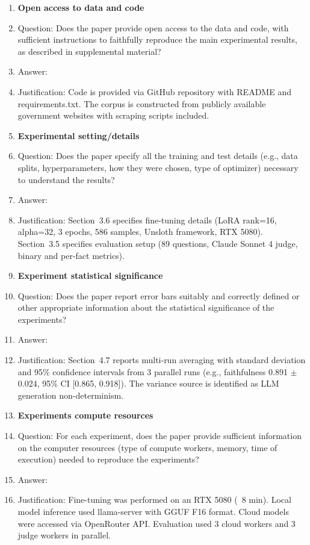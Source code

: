 \begin{enumerate}
\item {\bf Open access to data and code}
    \item[] Question: Does the paper provide open access to the data and code, with sufficient instructions to faithfully reproduce the main experimental results, as described in supplemental material?
    \item[] Answer: \answerYes{}
    \item[] Justification: Code is provided via GitHub repository with README and requirements.txt. The corpus is constructed from publicly available government websites with scraping scripts included.

\item {\bf Experimental setting/details}
    \item[] Question: Does the paper specify all the training and test details (e.g., data splits, hyperparameters, how they were chosen, type of optimizer) necessary to understand the results?
    \item[] Answer: \answerYes{}
    \item[] Justification: Section~3.6 specifies fine-tuning details (LoRA rank=16, alpha=32, 3 epochs, 586 samples, Unsloth framework, RTX 5080). Section~3.5 specifies evaluation setup (89 questions, Claude Sonnet 4 judge, binary and per-fact metrics).

\item {\bf Experiment statistical significance}
    \item[] Question: Does the paper report error bars suitably and correctly defined or other appropriate information about the statistical significance of the experiments?
    \item[] Answer: \answerYes{}
    \item[] Justification: Section~4.7 reports multi-run averaging with standard deviation and 95\% confidence intervals from 3 parallel runs (e.g., faithfulness 0.891 $\pm$ 0.024, 95\% CI [0.865, 0.918]). The variance source is identified as LLM generation non-determinism.

\item {\bf Experiments compute resources}
    \item[] Question: For each experiment, does the paper provide sufficient information on the computer resources (type of compute workers, memory, time of execution) needed to reproduce the experiments?
    \item[] Answer: \answerYes{}
    \item[] Justification: Fine-tuning was performed on an RTX 5080 (~8 min). Local model inference used llama-server with GGUF F16 format. Cloud models were accessed via OpenRouter API. Evaluation used 3 cloud workers and 3 judge workers in parallel.


\end{enumerate}
